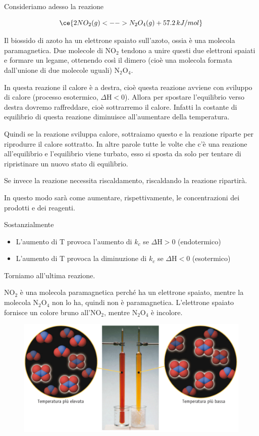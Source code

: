 Consideriamo adesso la reazione

$$\ce{2NO_2(g) <--> N_2O_4(g) + 57.2 \, kJ/mol}$$

Il biossido di azoto ha un elettrone spaiato sull'azoto, ossia è una molecola paramagnetica. Due molecole di NO$_2$ tendono a unire questi due elettroni spaiati e formare un legame, ottenendo così il dimero (cioè una molecola formata dall'unione di due molecole uguali) N$_2$O$_4$.

In questa reazione il calore è a destra, cioè questa reazione avviene con sviluppo di calore (processo esotermico, $\Delta$H$<$0). Allora per spostare l'equilibrio verso destra dovremo raffreddare, cioè sottrarremo il calore. Infatti la costante di equilibrio di questa reazione diminuisce all'aumentare della temperatura.

Quindi se la reazione sviluppa calore, sottraiamo questo e la reazione riparte per riprodurre il calore sottratto. In altre parole tutte le volte che c'è una reazione all'equilibrio e l'equilibrio viene turbato, esso si sposta da solo per tentare di ripristinare un nuovo stato di equilibrio.

Se invece la reazione necessita riscaldamento, riscaldando la reazione ripartirà.

In questo modo sarà come aumentare, rispettivamente, le concentrazioni dei prodotti e dei reagenti.

Sostanzialmente

\begin{itemize}
    \item L'aumento di T provoca l'aumento di $k_c$ se $\Delta$H$>$0 (endotermico)
    \item L'aumento di T provoca la diminuzione di $k_c$ se $\Delta$H$<$0 (esotermico)
\end{itemize}

Torniamo all'ultima reazione.

NO$_2$ è una molecola paramagnetica perché ha un elettrone spaiato, mentre la molecola N$_2$O$_4$ non lo ha, quindi non è paramagnetica. L'elettrone spaiato fornisce un colore bruno all'NO$_2$, mentre N$_2$O$_4$ è incolore.

\begin{figure}[htp]
    \centering
    \includegraphics[width=14cm]{immagini/reazione_NO_2.png}
\end{figure}

